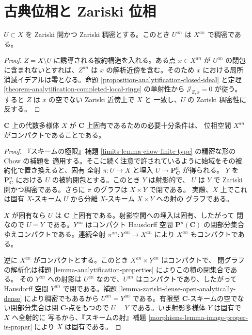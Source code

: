 \section{古典位相と Zariski 位相}
\label{section-classical-zariski-topologies}

\begin{lemma}
\label{lemma-zariski-dense-open-analytically-dense}
$U \subset X$ を Zariski 開かつ Zariski 稠密とする。このとき $U^{an}$ は
$X^{an}$ で稠密である。
\end{lemma}

\begin{proof}
$Z=X\setminus U$ に誘導される被約構造を入れる。ある点 $x \in X^{an}$ が
$U^{an}$ の閉包に含まれないとすれば、$Z^{an}$ は $x$ の解析近傍を含む。そのため
$x$ における局所消滅イデアルは零となる。命題
\ref{proposition-analytification-closed-ideal} と定理
\ref{theorem-analytification-completed-local-rings} の単射性から
$\mathcal J_{Z,x}=0$ が従う。すると $Z$ は $x$ の空でない Zariski 近傍上で $X$ と
一致し、$U$ の Zariski 稠密性に反する。
\end{proof}

\begin{proposition}
\label{proposition-proper-if-and-only-if-compact-analytification}
$\mathbf C$ 上の代数多様体 $X$ が $\mathbf C$ 上固有であるための必要十分条件は、
位相空間 $X^{an}$ がコンパクトであることである。
\end{proposition}

\begin{proof}
『スキームの極限』補題 \ref{limits-lemma-chow-finite-type} の精密な形の Chow の補題を
適用する。そこに続く注意で許されているように始域をその被約化で置き換えると、固有
全射 $\pi : U \to X$ と埋入 $U \to \mathbf P^n_{\mathbf C}$ が得られる。
$Y$ を $\mathbf P^n_{\mathbf C}$ における $U$ の被約閉包とする。このとき $Y$ は射影的で、
$U$ は $Y$ で Zariski 開かつ稠密である。さらに $\pi$ のグラフは $X\times Y$ で閉である。
実際、$X$ 上でこれは固有 $X$-スキーム $U$ から分離 $X$-スキーム $X\times Y$ への射の
グラフである。

$X$ が固有なら $U$ は $\mathbf C$ 上固有である。射影空間への埋入は固有、したがって
閉なので $U=Y$ である。$Y^{an}$ はコンパクト Hausdorff 空間
$\mathbf P^n(\mathbf C)$ の閉部分集合ゆえコンパクトである。連続全射
$\pi^{an}:Y^{an}\to X^{an}$ により $X^{an}$ もコンパクトである。

逆に $X^{an}$ がコンパクトとする。このとき $X^{an}\times Y^{an}$ はコンパクトで、
閉グラフの解析化は補題 \ref{lemma-analytification-properties} によりこの積の閉集合である。
その $Y^{an}$ への射影は $U^{an}$ なので、$U^{an}$ はコンパクトであり、したがって
Hausdorff 空間 $Y^{an}$ で閉である。補題
\ref{lemma-zariski-dense-open-analytically-dense} により稠密でもあるから
$U^{an}=Y^{an}$ である。有限型 $\mathbf C$-スキームの空でない閉部分集合は閉
$\mathbf C$-点をもつので $U=Y$ である。いま射影多様体 $Y$ は固有で $X$ へ全射的に
写るから、『スキームの射』補題 \ref{morphisms-lemma-image-proper-is-proper} により
$X$ は固有である。
\end{proof}

